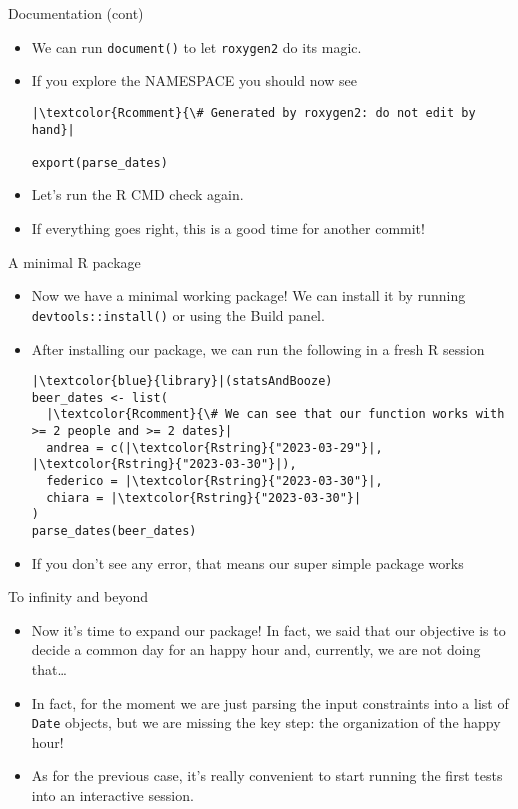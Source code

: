 \documentclass[
hyperref={bookmarks=false},
xcolor={dvipsnames,svgnames*,x11names*}, 
12pt
]{beamer}
\begin{document}
\begin{frame}[fragile]{Documentation (cont)}
\vspace{-0.5cm}
\begin{itemize}
\itemsep 3ex
\item We can run \texttt{document()} to let \texttt{roxygen2} do its magic. 
\item If you explore the NAMESPACE you should now see 
\begin{lstlisting}
|\textcolor{Rcomment}{\# Generated by roxygen2: do not edit by hand}|

export(parse_dates)
\end{lstlisting}
\item Let's run the R CMD check again. 
\item If everything goes right, this is a good time for another commit! 
\end{itemize}
\end{frame}

\begin{frame}[fragile]{A minimal R package}
\vspace{-0.5cm}
\begin{itemize}
\itemsep 2ex
\item Now we have a minimal working package! We can install it by running \texttt{devtools::install()} or using the Build panel. 
\item After installing our package, we can run the following in a fresh R session
\begin{lstlisting}
|\textcolor{blue}{library}|(statsAndBooze)
beer_dates <- list(
  |\textcolor{Rcomment}{\# We can see that our function works with >= 2 people and >= 2 dates}|
  andrea = c(|\textcolor{Rstring}{"2023-03-29"}|, |\textcolor{Rstring}{"2023-03-30"}|), 
  federico = |\textcolor{Rstring}{"2023-03-30"}|,
  chiara = |\textcolor{Rstring}{"2023-03-30"}|
)
parse_dates(beer_dates)
\end{lstlisting}
\item If you don't see any error, that means our super simple package works 
\end{itemize}
\end{frame}

\begin{frame}[fragile]{To infinity and beyond }
\vspace{-0.5cm}
\begin{itemize}
\itemsep 3ex
\item Now it's time to expand our package! In fact, we said that our objective is to decide a common day for an happy hour and, currently, we are not doing that\dots 
\item In fact, for the moment we are just parsing the input constraints into a list of \texttt{Date} objects, but we are missing the key step: the organization of the happy hour!  
\item As for the previous case, it's really convenient to start running the first tests into an interactive session. 
\end{itemize}
\end{frame}
\end{document}
